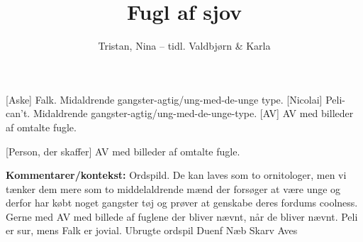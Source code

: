 \documentclass[a4paper,11pt]{article}
\title{Fugl af sjov}
\author{Tristan, Nina -- tidl. Valdbjørn \& Karla}
\begin{document}
\maketitle

\begin{roles}
    [Aske] Falk. Midaldrende gangster-agtig/ung-med-de-unge type.
    [Nicolai] Peli-can't. Midaldrende gangster-agtig/ung-med-de-unge-type.
    [AV] AV med billeder af omtalte fugle.
\end{roles}

\begin{props}
    [Person, der skaffer] AV med billeder af omtalte fugle.
\end{props}

\textbf{Kommentarer/kontekst:}
Ordspild. De kan laves som to ornitologer, men vi tænker dem mere som to middelaldrende mænd der forsøger at være unge og derfor har købt noget gangster tøj og prøver at genskabe deres fordums coolness. Gerne med AV med billede af fuglene der bliver nævnt, når de bliver nævnt. Peli er sur, mens Falk er jovial.
Ubrugte ordspil
Duenf
Næb
Skarv
Aves
\end{document}
